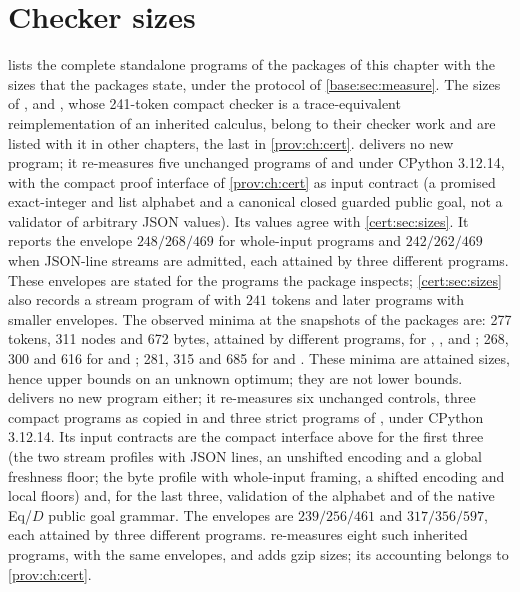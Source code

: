 \section{Checker sizes}
\label{obs:sec:sizes}

 lists the complete standalone programs of the packages of
this chapter with the sizes that the packages state, under the protocol of
\cref{base:sec:measure}. The sizes of ,
 and , whose
241-token compact checker is a trace-equivalent reimplementation of an inherited
calculus, belong to their checker work and are listed with it in other
chapters, the last in \cref{prov:ch:cert}.
 delivers no new program; it
re-measures five unchanged programs of  and
 under CPython 3.12.14, with the compact proof interface of
\cref{prov:ch:cert} as input contract (a promised exact-integer and list
alphabet and a canonical closed guarded public goal, not a validator of
arbitrary JSON values). Its values agree with \cref{cert:sec:sizes}. It
reports the envelope $248/268/469$ for whole-input programs and $242/262/469$
when JSON-line streams are admitted, each attained by three different
programs. These envelopes are stated for the programs the package inspects;
\cref{cert:sec:sizes} also records a stream program of
 with $241$ tokens and later programs
with smaller envelopes. The observed minima at the
snapshots of the packages are: 277 tokens, 311 nodes and 672 bytes, attained by
different programs, for , ,
 and ; 268, 300 and 616 for
 and ; 281, 315 and 685 for
 and . These minima are
attained sizes, hence upper bounds on an unknown optimum; they are not lower
bounds.  delivers no new program either; it
re-measures six unchanged controls, three compact programs as copied in
 and three strict programs of
, under CPython 3.12.14. Its input contracts
are the compact interface above for the first three (the two stream profiles
with JSON lines, an unshifted encoding and a global freshness floor; the byte
profile with whole-input framing, a shifted encoding and local floors) and,
for the last three, validation of the alphabet and of the native Eq/$D$ public
goal grammar. The envelopes are $239/256/461$ and $317/356/597$, each attained
by three different programs.  re-measures eight such
inherited programs, with the same envelopes, and adds gzip sizes; its
accounting belongs to \cref{prov:ch:cert}.

